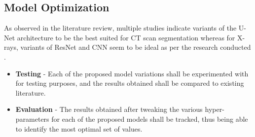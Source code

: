 \subsection{Model Optimization}
As observed in the literature review, multiple studies \cite{CXZ+2020, CYZ+2020, HLR+2020, YHQ+2020, GOM+2020, LLL+2020, CJL+2020, JSB+2020, SFY+2020} indicate variants of the U-Net architecture to be the best suited for CT scan segmentation whereas for X-rays, variants of ResNet and CNN seem to be ideal as per the research conducted \cite{ZXS+2020, AKP2020, GHT2020, LWA2020}.
\begin{itemize}
    \item \textbf{Testing} - Each of the proposed model variations shall be experimented with for testing purposes, and the results obtained shall be compared to existing literature. 
     \item \textbf{Evaluation} - The results obtained after tweaking the various hyper-parameters for each of the proposed models shall be tracked, thus being able to identify the most optimal set of values.
\end{itemize}
